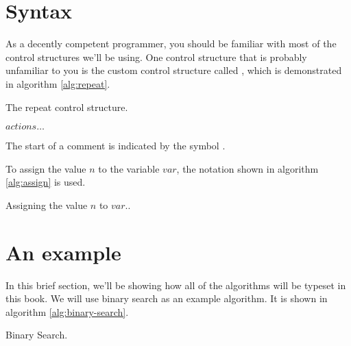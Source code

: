 \section{Syntax}
\label{sec:other-conventions}

As a decently competent programmer, you should be familiar with most
of the control structures we'll be using. One control structure that
is probably unfamiliar to you is the custom control structure called
\algorithmicrepeat, which is demonstrated in algorithm \ref{alg:repeat}.


\begin{algorithm}[H]
  \caption{The repeat control structure.}
  \label{alg:repeat}
  \begin{algorithmic}[1]
      \State $actions\ldots$ 
    \EndRepeatn
  \end{algorithmic}
\end{algorithm}

The start of a comment is indicated by the symbol \commentsymbol.

To assign the value $n$ to the variable $var$, the notation shown in
algorithm \ref{alg:assign} is used.

\begin{algorithm}[H]
  \caption{Assigning the value $n$ to $var$..}
  \label{alg:assign}
  \begin{algorithmic}[1]
  \end{algorithmic}
\end{algorithm}

\section{An example}

In this brief section, we'll be showing how all of the algorithms will
be typeset in this book. We will use binary search as an example
algorithm. It is shown in algorithm \ref{alg:binary-search}.

\begin{algorithm}[H]
  \caption{Binary Search.}
  \label{alg:binary-search}
  \begin{algorithmic}[1]
      \Repeat
        \Else
        \EndIf
    \EndFunction
  \end{algorithmic}
\end{algorithm}